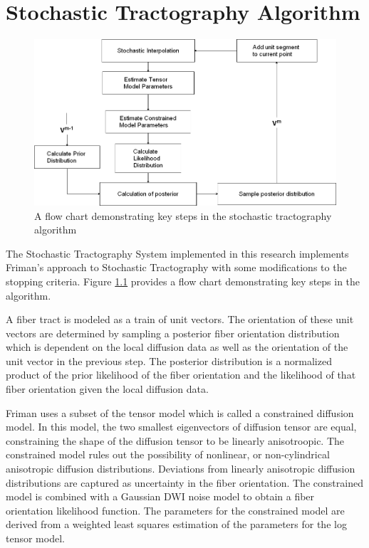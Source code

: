 \chapter{Stochastic Tractography Algorithm}
\begin{figure} \label{fig:stflow}
  \center 
	\includegraphics[width=\linewidth]{stflow}
	\caption{A flow chart demonstrating key steps in the stochastic tractography algorithm}
\end{figure}
The Stochastic Tractography System implemented in this research implements Friman's \cite{frimanTMI06} approach to Stochastic Tractography with some modifications to the stopping criteria.  Figure \ref{fig:stflow} provides a flow chart demonstrating key steps in the algorithm. 

A fiber tract is modeled as a train of unit vectors.  The orientation of these unit vectors are determined by sampling a posterior fiber orientation distribution which is dependent on the local diffusion data as well as the orientation of the unit vector in the previous step.  The posterior distribution is a normalized product of the prior likelihood of the fiber orientation and the likelihood of that fiber orientation given the local diffusion data.

Friman uses a subset of the tensor model which is called a constrained diffusion model.  In this model, the two smallest eigenvectors of diffusion tensor are equal, constraining the shape of the diffusion tensor to be linearly anisotroopic.  The constrained model rules out the possibility of nonlinear, or non-cylindrical anisotropic diffusion distributions.  Deviations from linearly anisotropic diffusion distributions are captured as uncertainty in the fiber orientation.  The constrained model is combined with a Gaussian DWI noise model to obtain a fiber orientation likelihood function.  The parameters for the constrained model are derived from a weighted least squares estimation of the parameters for the log tensor model.

